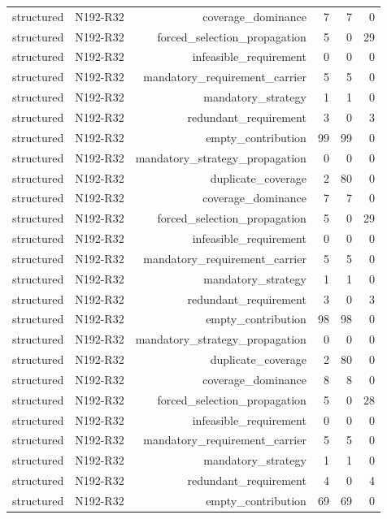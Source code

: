 {\begin{longtable}{lrrrrr}
structured & N192-R32 & coverage\_dominance & 7 & 7 & 0 \\
structured & N192-R32 & forced\_selection\_propagation & 5 & 0 & 29 \\
structured & N192-R32 & infeasible\_requirement & 0 & 0 & 0 \\
structured & N192-R32 & mandatory\_requirement\_carrier & 5 & 5 & 0 \\
structured & N192-R32 & mandatory\_strategy & 1 & 1 & 0 \\
structured & N192-R32 & redundant\_requirement & 3 & 0 & 3 \\
structured & N192-R32 & empty\_contribution & 99 & 99 & 0 \\
structured & N192-R32 & mandatory\_strategy\_propagation & 0 & 0 & 0 \\
structured & N192-R32 & duplicate\_coverage & 2 & 80 & 0 \\
structured & N192-R32 & coverage\_dominance & 7 & 7 & 0 \\
structured & N192-R32 & forced\_selection\_propagation & 5 & 0 & 29 \\
structured & N192-R32 & infeasible\_requirement & 0 & 0 & 0 \\
structured & N192-R32 & mandatory\_requirement\_carrier & 5 & 5 & 0 \\
structured & N192-R32 & mandatory\_strategy & 1 & 1 & 0 \\
structured & N192-R32 & redundant\_requirement & 3 & 0 & 3 \\
structured & N192-R32 & empty\_contribution & 98 & 98 & 0 \\
structured & N192-R32 & mandatory\_strategy\_propagation & 0 & 0 & 0 \\
structured & N192-R32 & duplicate\_coverage & 2 & 80 & 0 \\
structured & N192-R32 & coverage\_dominance & 8 & 8 & 0 \\
structured & N192-R32 & forced\_selection\_propagation & 5 & 0 & 28 \\
structured & N192-R32 & infeasible\_requirement & 0 & 0 & 0 \\
structured & N192-R32 & mandatory\_requirement\_carrier & 5 & 5 & 0 \\
structured & N192-R32 & mandatory\_strategy & 1 & 1 & 0 \\
structured & N192-R32 & redundant\_requirement & 4 & 0 & 4 \\
structured & N192-R32 & empty\_contribution & 69 & 69 & 0 \\

\end{longtable}}
